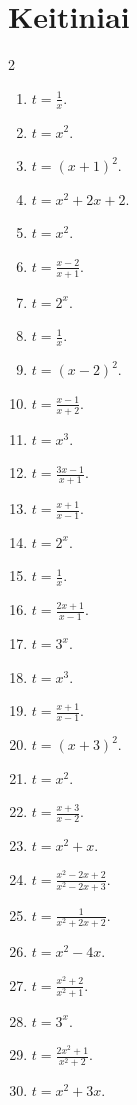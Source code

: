 \documentclass[11pt,a4paper]{article}
\begin{document}
\section*{Keitiniai}
\begin{multicols}{2}
\begin{enumerate}
\item \(\displaystyle t=\frac1x\).
\item \(\displaystyle t=x^2\).
\item \(\displaystyle t=\left(x+1\right)^2\).
\item \(\displaystyle t=x^2+2x+2\).
\item \(\displaystyle t=x^2\).
\item \(\displaystyle t=\frac{x-2}{x+1}\).
\item \(\displaystyle t=2^x\).
\item \(\displaystyle t=\frac1x\).
\item \(\displaystyle t=\left(x-2\right)^2\).
\item \(\displaystyle t=\frac{x-1}{x+2}\).
\item \(\displaystyle t=x^3\).
\item \(\displaystyle t=\frac{3x-1}{x+1}\).
\item \(\displaystyle t=\frac{x+1}{x-1}\).
\item \(\displaystyle t=2^x\).
\item \(\displaystyle t=\frac1x\).
\item \(\displaystyle t=\frac{2x+1}{x-1}\).
\item \(\displaystyle t=3^x\).
\item \(\displaystyle t=x^3\).
\item \(\displaystyle t=\frac{x+1}{x-1}\).
\item \(\displaystyle t=\left(x+3\right)^2\).
\item \(\displaystyle t=x^2\).
\item \(\displaystyle t=\frac{x+3}{x-2}\).
\item \(\displaystyle t=x^2+x\).
\item \(\displaystyle t=\frac{x^2-2x+2}{x^2-2x+3}\).
\item \(\displaystyle t=\frac1{x^2+2x+2}\).
\item \(\displaystyle t=x^2-4x\).
\item \(\displaystyle t=\frac{x^2+2}{x^2+1}\).
\item \(\displaystyle t=3^x\).
\item \(\displaystyle t=\frac{2x^2+1}{x^2+2}\).
\item \(\displaystyle t=x^2+3x\).

\end{enumerate}
\end{multicols}
\end{document}
